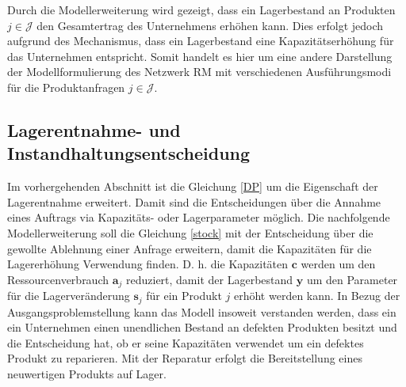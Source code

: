 Durch die Modellerweiterung wird gezeigt, dass ein Lagerbestand an Produkten $j\in\mathcal{J}$ den Gesamtertrag des Unternehmens erhöhen kann. Dies erfolgt jedoch aufgrund des Mechanismus, dass ein Lagerbestand eine Kapazitätserhöhung für das Unternehmen entspricht. Somit handelt es hier um eine andere Darstellung der Modellformulierung des Netzwerk RM mit verschiedenen Ausführungsmodi für die Produktanfragen $j\in\mathcal{J}$. %

\subsection{Lagerentnahme- und Instandhaltungsentscheidung}

Im vorhergehenden Abschnitt ist die Gleichung \eqref{DP} um die Eigenschaft der Lagerentnahme erweitert. Damit sind die Entscheidungen über die Annahme eines Auftrags via Kapazitäts- oder Lagerparameter möglich. Die nachfolgende Modellerweiterung soll die Gleichung \eqref{stock} mit der Entscheidung über die gewollte Ablehnung einer Anfrage erweitern, damit die Kapazitäten für die Lagererhöhung Verwendung finden. D. h. die Kapazitäten $\textbf{c}$ werden um den Ressourcenverbrauch $\textbf{a}_{j}$ reduziert, damit der Lagerbestand $\textbf{y}$ um den Parameter für die Lagerveränderung $\textbf{s}_{j}$ für ein Produkt $j$ erhöht werden kann. In Bezug der Ausgangsproblemstellung kann das Modell insoweit verstanden werden, dass ein ein Unternehmen einen unendlichen Bestand an defekten Produkten besitzt und die Entscheidung hat, ob er seine Kapazitäten verwendet um ein defektes Produkt zu reparieren. Mit der Reparatur erfolgt die Bereitstellung eines neuwertigen Produkts auf Lager.

